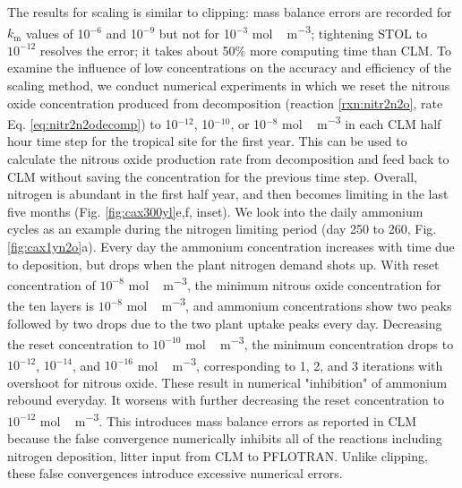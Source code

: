 \documentclass[gmd, manuscript]{copernicus}
\begin{document}
The results for scaling is similar to clipping: mass balance errors are recorded for $k_\text{m}$ values of 10$^{-6}$ and 10$^{-9}$ but not for 10$^{-3}$ \unit{mol\,m^{-3}};  tightening STOL to $10^{-12}$ resolves the error; it takes about 50\% more computing time than CLM. To examine the influence of low concentrations on the accuracy and efficiency of the scaling method, we conduct numerical experiments in which we reset the nitrous oxide concentration  produced from decomposition (reaction \ref{rxn:nitr2n2o}, rate Eq. \ref{eq:nitr2n2odecomp}) to 10$^{-12}$, 10$^{-10}$, or 10$^{-8}$ \unit{mol\,m^{-3}} in each CLM half hour time step for the tropical site for the first year. This can be used to calculate the nitrous oxide production rate from decomposition and feed back to CLM without saving the concentration for the previous time step. Overall, nitrogen is abundant in the first half year, and then becomes limiting in the last five months (Fig. \ref{fig:cax300yl}e,f, inset). We look into the daily ammonium cycles as an example during the nitrogen limiting period (day 250 to 260, Fig. \ref{fig:cax1yn2o}a). Every day the ammonium concentration increases with time due to deposition, but drops when the plant nitrogen demand shots up. With reset concentration of $10^{-8}$ \unit{mol\,m^{-3}}, the minimum nitrous oxide concentration for the ten layers is $10^{-8}$ \unit{mol\,m^{-3}}, and ammonium concentrations show two peaks followed by two drops due to the two  plant uptake peaks every day. Decreasing the reset concentration to $10^{-10}$ \unit{mol\,m^{-3}}, the minimum concentration drops to $10^{-12}$,  $10^{-14}$, and  $10^{-16}$ \unit{mol\,m^{-3}}, corresponding to 1, 2, and 3 iterations with overshoot for nitrous oxide. These result in numerical "inhibition" of ammonium rebound everyday. It worsens with further decreasing the reset concentration to $10^{-12}$ \unit{mol\,m^{-3}}. This introduces mass balance errors as reported in CLM because the false convergence numerically inhibits all of the reactions including nitrogen deposition, litter input from CLM to PFLOTRAN.  Unlike clipping, these false convergences introduce excessive numerical errors.
\end{document}
